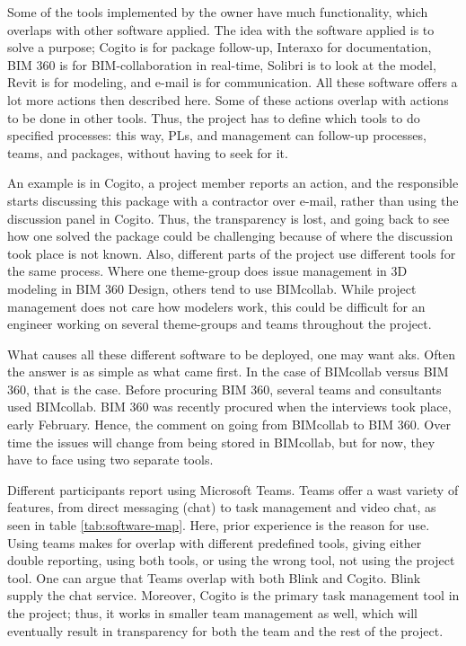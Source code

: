 Some of the tools implemented by the owner have much functionality, which overlaps with other software applied. The idea with the software applied is to solve a purpose; Cogito is for package follow-up, Interaxo for documentation, BIM 360 is for BIM-collaboration in real-time, Solibri is to look at the model, Revit is for modeling, and e-mail is for communication. All these software offers a lot more actions then described here. Some of these actions overlap with actions to be done in other tools. Thus, the project has to define which tools to do specified processes: this way, PLs, and management can follow-up processes, teams, and packages, without having to seek for it.

An example is in Cogito, a project member reports an action, and the responsible starts discussing this package with a contractor over e-mail, rather than using the discussion panel in Cogito. Thus, the transparency is lost, and going back to see how one solved the package could be challenging because of where the discussion took place is not known. Also, different parts of the project use different tools for the same process. Where one theme-group does issue management in 3D modeling in BIM 360 Design, others tend to use BIMcollab. While project management does not care how modelers work, this could be difficult for an engineer working on several theme-groups and teams throughout the project.

What causes all these different software to be deployed, one may want aks. Often the answer is as simple as what came first. In the case of BIMcollab versus BIM 360, that is the case. Before procuring BIM 360, several teams and consultants used BIMcollab. BIM 360 was recently procured when the interviews took place, early February. Hence, the comment on going from BIMcollab to BIM 360. Over time the issues will change from being stored in BIMcollab, but for now, they have to face using two separate tools. 

Different participants report using Microsoft Teams. Teams offer a wast variety of features, from direct messaging (chat) to task management and video chat, as seen in table \ref{tab:software-map}. Here, prior experience is the reason for use. Using teams makes for overlap with different predefined tools, giving either double reporting, using both tools, or using the wrong tool, not using the project tool. One can argue that Teams overlap with both Blink and Cogito. Blink supply the chat service. Moreover, Cogito is the primary task management tool in the project; thus, it works in smaller team management as well, which will eventually result in transparency for both the team and the rest of the project. 

